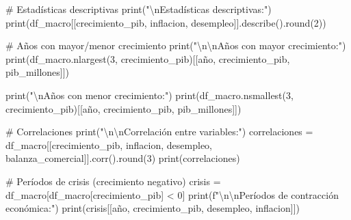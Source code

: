 \documentclass[
  doc,
  floatsintext,
  longtable,
  a4paper,
  nolmodern,
  notxfonts,
  notimes,
  12pt,
  colorlinks=true,linkcolor=blue,citecolor=blue,urlcolor=blue]{apa7}
\newenvironment{Shaded}{\begin{snugshade}}{\end{snugshade}}
\newcommand{\BuiltInTok}[1]{\textcolor[rgb]{0.00,0.23,0.31}{#1}}
\newcommand{\CharTok}[1]{\textcolor[rgb]{0.13,0.47,0.30}{#1}}
\newcommand{\CommentTok}[1]{\textcolor[rgb]{0.37,0.37,0.37}{#1}}
\newcommand{\DecValTok}[1]{\textcolor[rgb]{0.68,0.00,0.00}{#1}}
\newcommand{\NormalTok}[1]{\textcolor[rgb]{0.00,0.23,0.31}{#1}}
\newcommand{\OperatorTok}[1]{\textcolor[rgb]{0.37,0.37,0.37}{#1}}
\newcommand{\SpecialStringTok}[1]{\textcolor[rgb]{0.13,0.47,0.30}{#1}}
\newcommand{\StringTok}[1]{\textcolor[rgb]{0.13,0.47,0.30}{#1}}
\begin{document}
\begin{Shaded}
\begin{Highlighting}[]
\CommentTok{\# Estadísticas descriptivas}
\BuiltInTok{print}\NormalTok{(}\StringTok{"}\CharTok{\textbackslash{}n}\StringTok{Estadísticas descriptivas:"}\NormalTok{)}
\BuiltInTok{print}\NormalTok{(df\_macro[[}\StringTok{\textquotesingle{}crecimiento\_pib\textquotesingle{}}\NormalTok{, }\StringTok{\textquotesingle{}inflacion\textquotesingle{}}\NormalTok{, }\StringTok{\textquotesingle{}desempleo\textquotesingle{}}\NormalTok{]].describe().}\BuiltInTok{round}\NormalTok{(}\DecValTok{2}\NormalTok{))}

\CommentTok{\# Años con mayor/menor crecimiento}
\BuiltInTok{print}\NormalTok{(}\StringTok{"}\CharTok{\textbackslash{}n\textbackslash{}n}\StringTok{Años con mayor crecimiento:"}\NormalTok{)}
\BuiltInTok{print}\NormalTok{(df\_macro.nlargest(}\DecValTok{3}\NormalTok{, }\StringTok{\textquotesingle{}crecimiento\_pib\textquotesingle{}}\NormalTok{)[[}\StringTok{\textquotesingle{}año\textquotesingle{}}\NormalTok{, }\StringTok{\textquotesingle{}crecimiento\_pib\textquotesingle{}}\NormalTok{, }\StringTok{\textquotesingle{}pib\_millones\textquotesingle{}}\NormalTok{]])}

\BuiltInTok{print}\NormalTok{(}\StringTok{"}\CharTok{\textbackslash{}n}\StringTok{Años con menor crecimiento:"}\NormalTok{)}
\BuiltInTok{print}\NormalTok{(df\_macro.nsmallest(}\DecValTok{3}\NormalTok{, }\StringTok{\textquotesingle{}crecimiento\_pib\textquotesingle{}}\NormalTok{)[[}\StringTok{\textquotesingle{}año\textquotesingle{}}\NormalTok{, }\StringTok{\textquotesingle{}crecimiento\_pib\textquotesingle{}}\NormalTok{, }\StringTok{\textquotesingle{}pib\_millones\textquotesingle{}}\NormalTok{]])}

\CommentTok{\# Correlaciones}
\BuiltInTok{print}\NormalTok{(}\StringTok{"}\CharTok{\textbackslash{}n\textbackslash{}n}\StringTok{Correlación entre variables:"}\NormalTok{)}
\NormalTok{correlaciones }\OperatorTok{=}\NormalTok{ df\_macro[[}\StringTok{\textquotesingle{}crecimiento\_pib\textquotesingle{}}\NormalTok{, }\StringTok{\textquotesingle{}inflacion\textquotesingle{}}\NormalTok{, }\StringTok{\textquotesingle{}desempleo\textquotesingle{}}\NormalTok{, }
                          \StringTok{\textquotesingle{}balanza\_comercial\textquotesingle{}}\NormalTok{]].corr().}\BuiltInTok{round}\NormalTok{(}\DecValTok{3}\NormalTok{)}
\BuiltInTok{print}\NormalTok{(correlaciones)}

\CommentTok{\# Períodos de crisis (crecimiento negativo)}
\NormalTok{crisis }\OperatorTok{=}\NormalTok{ df\_macro[df\_macro[}\StringTok{\textquotesingle{}crecimiento\_pib\textquotesingle{}}\NormalTok{] }\OperatorTok{\textless{}} \DecValTok{0}\NormalTok{]}
\BuiltInTok{print}\NormalTok{(}\SpecialStringTok{f"}\CharTok{\textbackslash{}n\textbackslash{}n}\SpecialStringTok{Períodos de contracción económica:"}\NormalTok{)}
\BuiltInTok{print}\NormalTok{(crisis[[}\StringTok{\textquotesingle{}año\textquotesingle{}}\NormalTok{, }\StringTok{\textquotesingle{}crecimiento\_pib\textquotesingle{}}\NormalTok{, }\StringTok{\textquotesingle{}desempleo\textquotesingle{}}\NormalTok{, }\StringTok{\textquotesingle{}inflacion\textquotesingle{}}\NormalTok{]])}


\end{Highlighting}
\end{Shaded}
\end{document}
